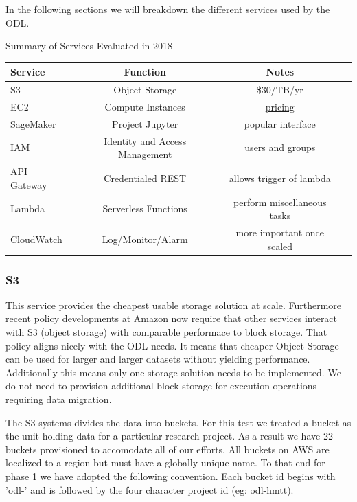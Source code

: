 In the following sections we will breakdown the different services used by the ODL.

\begin{table}[htbp]
\begin{center}
Summary of Services Evaluated in 2018
\begin{tabular}{lccr}
\hline
\hline
Service & Function & Notes \\
\hline
\hline
S3 & Object Storage & \$30/TB/yr \\
EC2 & Compute Instances & \href{https://aws.amazon.com/ec2/pricing/on-demand/}{pricing} \\
SageMaker & Project Jupyter & popular interface \\
IAM &  Identity and Access Management  & users and groups \\
API Gateway & Credentialed REST & allows trigger of lambda \\
Lambda & Serverless Functions & perform miscellaneous tasks\\
CloudWatch & Log/Monitor/Alarm & more important once scaled \\
\hline
\hline
\end{tabular}
\end{center}
\end{table}

\subsubsection{S3}
This service provides the cheapest usable storage solution at scale. Furthermore recent policy developments at Amazon now require that other services interact with S3 (object storage) with comparable performace to block storage. That policy aligns nicely with the ODL needs. It means that cheaper Object Storage can be used for larger and larger datasets without yielding performance. Additionally this means only one storage solution needs to be implemented. We do not need to provision additional block storage for execution operations requiring data migration.

The S3 systems divides the data into buckets. For this test we treated a bucket as the unit holding data for a particular research project. As a result we have 22 buckets provisioned to accomodate all of our efforts. All buckets on AWS are localized to a region but must have a globally unique name. To that end for phase 1 we have adopted the following convention. Each bucket id begins with 'odl-' and is followed by the four character project id (eg: odl-hmtt).

